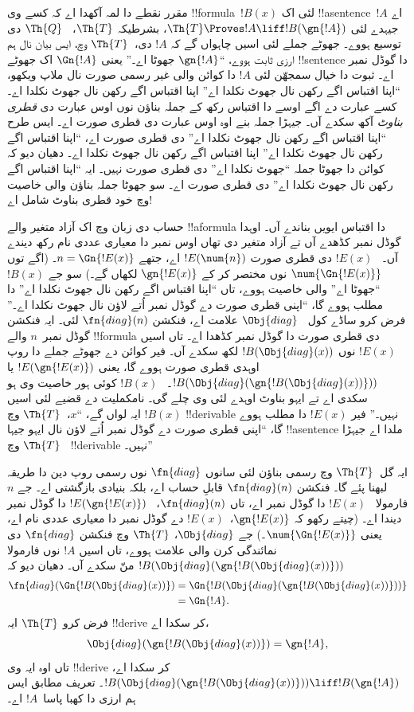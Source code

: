 \documentclass[../../../include/open-logic-section]{subfiles}
\begin{document}


\begin{explain}
مقرر نقطے دا لمہ آکھدا اے کہ کسے وی !!{formula}~$!B(x)$
لئی اک !!a{sentence}~$!A$ اے جیہدے لئی
$\Th{T} \Proves !A \liff !B(\gn{!A})$، بشرطیکہ $\Th{T}$،
~$\Th{Q}$ دی توسیع ہووے۔ جھوٹے جملے لئی اسیں چاہواں گے
کہ $!A$ دی،~$\Th{T}$ وچ، ایس بیان نال ہم ارزی ثابت ہووے،
“$\gn{!A}$ جھوٹا اے۔” یعنی $\Gn{!A}$ اک جھوٹے
!!{sentence} دا گوڈل نمبر اے۔ ثبوت دا خیال سمجھّن لئی $!A$
دا کوائن والی غیر رسمی صورت نال ملاپ ویکھو،
“اپنا اقتباس اگے رکھن نال جھوٹ نکلدا اے” اپنا اقتباس اگے
رکھن نال جھوٹ نکلدا اے۔ کسے عبارت دے اگے اوسے دا اقتباس
رکھ کے جملہ بناؤن نوں اوس عبارت دی \emph{قطری بناوٹ}
آکھ سکدے آں۔ جیہڑا جملہ بنے اوہ اوس عبارت دی قطری صورت
اے۔ ایس طرح “اپنا اقتباس اگے رکھن نال جھوٹ نکلدا اے” دی
قطری صورت اے، “اپنا اقتباس اگے رکھن نال جھوٹ نکلدا اے”
اپنا اقتباس اگے رکھن نال جھوٹ نکلدا اے۔
دھیان دیو کہ کوائن دا جھوٹا جملہ “جھوٹ نکلدا اے” دی قطری
صورت نہیں۔ ایہ “اپنا اقتباس اگے رکھن نال جھوٹ نکلدا اے”
دی قطری صورت اے۔ سو جھوٹا جملہ بناؤن والی خاصیت وچ خود
قطری بناوٹ شامل اے!{}

حساب دی زبان وچ اک آزاد متغیر والے !!a{formula} دا اقتباس
ایویں بناندے آں۔ اوہدا گوڈل نمبر کڈھدے آں تے آزاد متغیر دی
تھاں اوس نمبر دا معیاری عددی نام رکھ دیندے آں۔
~$!E(x)$ دی قطری صورت $!E(\num{n})$ اے، جتھے
$n = \Gn{!E(x)}$۔ (اگے توں $\num{\Gn{!E(x)}}$ نوں
مختصر کر کے $\gn{!E(x)}$ لکھاں گے۔) سو جے $!B(x)$
“جھوٹا اے” والی خاصیت ہووے، تاں “اپنا اقتباس اگے رکھن نال
جھوٹ نکلدا اے” دا مطلب ہووے گا، “اپنی قطری صورت دے گوڈل
نمبر اُتے لاؤن نال جھوٹ نکلدا اے۔” فرض کرو ساڈے کول
~$\Obj{diag}$ علامت اے، فنکشن $\fn{diag}(n)$ لئی۔
ایہ فنکشن گوڈل نمبر~$n$ والے !!{formula} دی قطری صورت
دا گوڈل نمبر کڈھدا اے۔ تاں اسیں $!E(x)$ نوں
$!B(\Obj{diag}(x))$ لکھ سکدے آں۔ فیر کوائن دے جھوٹے
جملے دا روپ اوہدی قطری صورت ہووے گا، یعنی $!E(\gn{!E(x)})$
یا $!B(\Obj{diag}(\gn{!B(\Obj{diag}(x))}))$۔
~$!B(x)$ کوئی ہور خاصیت وی ہو سکدی اے تے ایہو بناوٹ
اوہدے لئی وی چلے گی۔ نامکملیت دے قضیے لئی اسیں $!B(x)$
ایہ لواں گے، “$x$،~$\Th{T}$ وچ !!{derivable} نہیں۔”
فیر $!E(x)$ دا مطلب ہووے گا، “اپنی قطری صورت دے گوڈل
نمبر اُتے لاؤن نال ایہو جیہا !!a{sentence} ملدا اے جیہڑا
~$\Th{T}$ وچ !!{derivable} نہیں۔”

ایہ گل~$\Th{T}$ وچ رسمی بناؤن لئی سانوں $\fn{diag}$ نوں
رسمی روپ دین دا طریقہ لبھنا پئے گا۔ فنکشن $\fn{diag}(n)$
قابلِ حساب اے، بلکہ بنیادی بازگشتی اے۔ جے $n$ فارمولا
~$!E(x)$ دا گوڈل نمبر اے، تاں $\fn{diag}(n)$،
~$!E(\gn{!E(x)})$ دا گوڈل نمبر دیندا اے۔ (چیتے رکھو کہ
$\gn{!E(x)}$،~$!E(x)$ دے گوڈل نمبر دا معیاری عددی نام
اے، یعنی $\num{\Gn{!E(x)}}$۔) جے $\Obj{diag}$،
$\Th{T}$ وچ فنکشن $\fn{diag}$ دی نمائندگی کرن والی علامت
ہووے، تاں اسیں $!A$ نوں فارمولا
$!B(\Obj{diag}(\gn{!B(\Obj{diag}(x))}))$ منّ سکدے آں۔
دھیان دیو کہ
\begin{align*}
\fn{diag}(\Gn{!B(\Obj{diag}(x))}) & =
\Gn{!B(\Obj{diag}(\gn{!B(\Obj{diag}(x))}))} \\
& = \Gn{!A}.
\end{align*}
فرض کرو $\Th{T}$ ایہ !!{derive} کر سکدا اے،
\[
\Obj{diag}(\gn{!B(\Obj{diag}(x))}) = \gn{!A},
\]
تاں اوہ ایہ وی !!{derive} کر سکدا اے،
$!B(\Obj{diag}(\gn{!B(\Obj{diag}(x))}))
\liff !B(\gn{!A})$۔ تعریف مطابق ایس ہم ارزی دا کھبا
پاسا~$!A$ اے۔


\end{explain}
\end{document}
